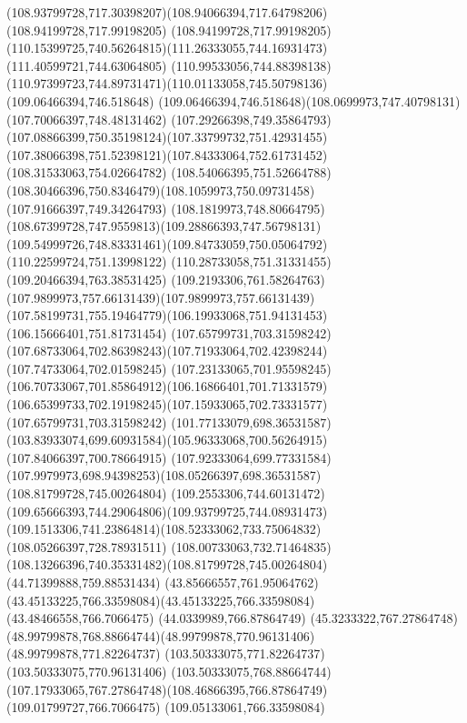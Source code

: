 {{		\curveto(108.93799728,717.30398207)(108.94066394,717.64798206)(108.94199728,717.99198205)
		\curveto(108.94199728,717.99198205)(110.15399725,740.56264815)(111.26333055,744.16931473)
		\lineto(111.40599721,744.63064805)
		\lineto(110.99533056,744.88398138)
		\curveto(110.97399723,744.89731471)(110.01133058,745.50798136)(109.06466394,746.518648)
		\curveto(109.06466394,746.518648)(108.0699973,747.40798131)(107.70066397,748.48131462)
		\curveto(107.29266398,749.35864793)(107.08866399,750.35198124)(107.33799732,751.42931455)
		\curveto(107.38066398,751.52398121)(107.84333064,752.61731452)(108.31533063,754.02664782)
		\lineto(108.54066395,751.52664788)
		\curveto(108.30466396,750.8346479)(108.1059973,750.09731458)(107.91666397,749.34264793)
		\curveto(108.1819973,748.80664795)(108.67399728,747.9559813)(109.28866393,747.56798131)
		\curveto(109.54999726,748.83331461)(109.84733059,750.05064792)(110.22599724,751.13998122)
		\lineto(110.28733058,751.31331455)
		\lineto(109.20466394,763.38531425)
		\curveto(109.2193306,761.58264763)(107.9899973,757.66131439)(107.9899973,757.66131439)
		\curveto(107.58199731,755.19464779)(106.19933068,751.94131453)(106.15666401,751.81731454)
		\moveto(107.65799731,703.31598242)
		\curveto(107.68733064,702.86398243)(107.71933064,702.42398244)(107.74733064,702.01598245)
		\curveto(107.23133065,701.95598245)(106.70733067,701.85864912)(106.16866401,701.71331579)
		\curveto(106.65399733,702.19198245)(107.15933065,702.73331577)(107.65799731,703.31598242)
		\moveto(101.77133079,698.36531587)
		\curveto(103.83933074,699.60931584)(105.96333068,700.56264915)(107.84066397,700.78664915)
		\curveto(107.92333064,699.77331584)(107.9979973,698.94398253)(108.05266397,698.36531587)
		\closepath
		\moveto(108.81799728,745.00264804)
		\curveto(109.2553306,744.60131472)(109.65666393,744.29064806)(109.93799725,744.08931473)
		\curveto(109.1513306,741.23864814)(108.52333062,733.75064832)(108.05266397,728.78931511)
		\curveto(108.00733063,732.71464835)(108.13266396,740.35331482)(108.81799728,745.00264804)
		\moveto(44.71399888,759.88531434)
		\curveto(43.85666557,761.95064762)(43.45133225,766.33598084)(43.45133225,766.33598084)
		\lineto(43.48466558,766.7066475)
		\lineto(44.0339989,766.87864749)
		\curveto(45.3233322,767.27864748)(48.99799878,768.88664744)(48.99799878,770.96131406)
		\lineto(48.99799878,771.82264737)
		\lineto(103.50333075,771.82264737)
		\lineto(103.50333075,770.96131406)
		\curveto(103.50333075,768.88664744)(107.17933065,767.27864748)(108.46866395,766.87864749)
		\lineto(109.01799727,766.7066475)
		\lineto(109.05133061,766.33598084)
}}
